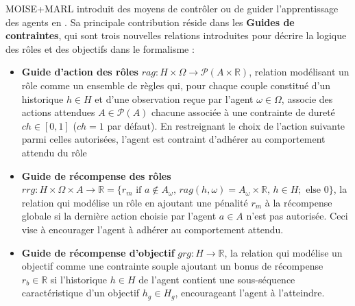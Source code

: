 \noindent MOISE+MARL introduit des moyens de contrôler ou de guider l'apprentissage des agents en . Sa principale contribution réside dans les \textbf{Guides de contraintes}, qui sont trois nouvelles relations introduites pour décrire la logique des rôles et des objectifs dans le formalisme  :
%
\begin{itemize}

  \item \textbf{Guide d'action des rôles} \quad $rag: H \times \Omega \rightarrow \mathcal{P}(A \times \mathbb{R})$, relation modélisant un rôle comme un ensemble de règles qui, pour chaque couple constitué d'un historique $h \in H$ et d'une observation reçue par l'agent $\omega \in \Omega$, associe des actions attendues $A \in \mathcal{P}(A)$ chacune associée à une contrainte de dureté $ch \in [0,1]$ ($ch = 1$ par défaut). En restreignant le choix de l'action suivante parmi celles autorisées, l'agent est contraint d'adhérer au comportement attendu du rôle
  \item \textbf{Guide de récompense des rôles} \quad $rrg: H \times \Omega \times A \to \mathbb{R} = \{r_m \text{ if } a \notin A_\omega \text{, } rag(h, \omega) \allowbreak = \allowbreak A_\omega \times \mathbb{R} \text{, } h \in H; \text{ else } 0\}$, la relation qui modélise un rôle en ajoutant une pénalité $r_m$ à la récompense globale si la dernière action choisie par l'agent $a \in A$ n'est pas autorisée. Ceci vise à encourager l'agent à adhérer au comportement attendu.
  \item \textbf{Guide de récompense d'objectif} \quad $grg: H \rightarrow \mathbb{R}$, la relation qui modélise un objectif comme une contrainte souple ajoutant un bonus de récompense $r_b \in \mathbb{R}$ si l'historique $h \in H$ de l'agent contient une sous-séquence caractéristique d'un objectif $h_g \in H_g$, encourageant l'agent à l'atteindre.
\end{itemize}

